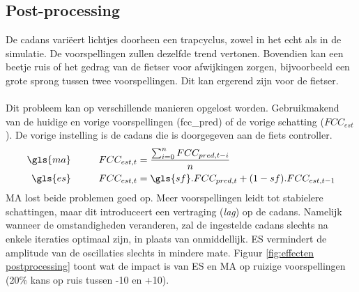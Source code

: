 \subsection*{Post-processing}
De cadans variëert lichtjes doorheen een trapcyclus, zowel in het echt als in de simulatie. De voorspellingen zullen dezelfde trend vertonen. Bovendien kan een beetje ruis of het gedrag van de fietser voor afwijkingen zorgen, bijvoorbeeld een grote sprong tussen twee voorspellingen. Dit kan ergerend zijn voor de fietser.
\\\\
Dit probleem kan op verschillende manieren opgelost worden. Gebruikmakend van de huidige en vorige voorspellingen (\gls{fcc_pred}) of de vorige schatting ($FCC_{est}$). De vorige instelling is de cadans die is doorgegeven aan de fiets controller.
\begin{align*}
\gls{ma} \tab  FCC_{est,t} &= \frac{\sum_{i=0}^{n} FCC_{pred,t-i} }{n}\\
\gls{es} \tab FCC_{est,t} &= \gls{sf} . FCC_{pred,t} + (1-sf) . FCC_{est,t-1}
\end{align*}
MA lost beide problemen goed op. Meer voorspellingen leidt tot stabielere schattingen, maar dit introduceert een vertraging (\textit{lag}) op de cadans. Namelijk wanneer de omstandigheden veranderen, zal de ingestelde cadans slechts na enkele iteraties optimaal zijn, in plaats van onmiddellijk. ES vermindert de amplitude van de oscillaties slechts in mindere mate. Figuur \ref{fig:effecten postprocessing} toont wat de impact is van ES en MA op ruizige voorspellingen (20\% kans op ruis tussen -10 en +10).
